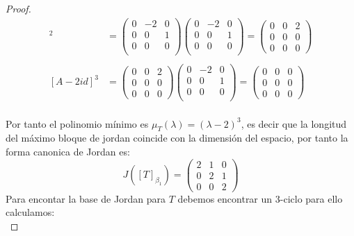 \documentclass[11pt]{article}
\begin{document}
\begin{proof}
\begin{align*}
        [A-2id]^2&=\begin{pmatrix}
            0&-2&0\\
            0&0&1\\
            0&0&0\\
        \end{pmatrix}
        \begin{pmatrix}
            0&-2&0\\
            0&0&1\\
            0&0&0\\
        \end{pmatrix}=\begin{pmatrix}
            0&0&2\\
            0&0&0\\
            0&0&0
        \end{pmatrix}\\
        \,\\
        [A-2id]^3&=\begin{pmatrix}
            0&0&2\\
            0&0&0\\
            0&0&0
        \end{pmatrix}
        \begin{pmatrix}
            0&-2&0\\
            0&0&1\\
            0&0&0\\
        \end{pmatrix}=\begin{pmatrix}
            0&0&0\\
            0&0&0\\
            0&0&0
        \end{pmatrix}
    \end{align*}\,\\
    Por tanto el polinomio m\'inimo es $\mu_T(\lambda)=(\lambda-2)^3$, es decir que la longitud del m\'aximo bloque de jordan coincide con la dimensi\'on del
    espacio, por tanto la forma canonica de Jordan es:\,\\
    \begin{equation*}
        J([T]_{\beta_1})=\begin{pmatrix}
            2&1&0\\
            0&2&1\\
            0&0&2
        \end{pmatrix}
    \end{equation*}
    Para encontar la base de Jordan para $T$ debemos encontrar un $3$-ciclo para ello calculamos:\,\\

\end{proof}
\end{document}
